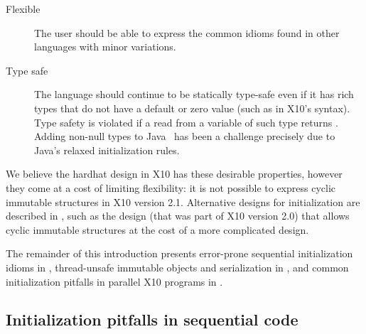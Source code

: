 \begin{description}
  \item[Flexible]
    The user should be able to express the common idioms
        found in other languages with minor variations.

  \item[Type safe]
    The language should continue to be statically type-safe even
        if it has rich types that do not have a default or zero value (such as  in X10's syntax).
    Type safety is violated if a read from a variable of such type returns .
    Adding non-null types to Java~\cite{Fahndrich:2003:DCN:949305.949332,Fahndrich:2007:EOI:1297027.1297052,XinQi:2009}
        has been a challenge precisely due to
        Java's relaxed initialization rules.
\end{description}

We believe the hardhat design in X10 has these desirable properties,
    however they come at a cost of limiting flexibility:
    it is not possible to express cyclic immutable structures in X10 version 2.1.
Alternative designs for initialization are described in ,
    such as the  design (that was part of X10 version 2.0) that allows cyclic immutable structures
    at the cost of a more complicated design.

The remainder of this introduction
    presents error-prone sequential initialization idioms in ,
    thread-unsafe immutable objects and serialization in , and
    common initialization pitfalls in parallel X10 programs in .

\subsection{Initialization pitfalls in sequential code}
\label{Section:Initialization-pitfalls}

